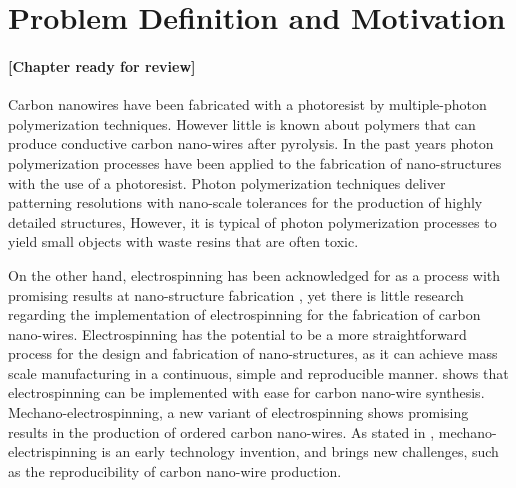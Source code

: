 
\chapter{Problem Definition and Motivation} %

\label{Chapter:ProblemDefinitionandMotivation}

\subsubsection*{\color{mygray}[Chapter ready for review]}

Carbon nanowires have been fabricated with a photoresist by multiple-photon polymerization techniques. However little is known about polymers that can produce conductive carbon nano-wires after pyrolysis. In the past years photon polymerization processes have been applied to the fabrication of nano-structures with the use of a photoresist. \cite{Boer2014} Photon polymerization techniques deliver patterning resolutions with nano-scale tolerances for the production of highly detailed structures, \cite{Hribar2014} However, it is typical of photon polymerization processes to yield small objects with waste resins that are often toxic. \cite{Ovsianikov2012}

On the other hand, electrospinning has been acknowledged for as a process with promising results at nano-structure fabrication \cite{Boer2014}, yet there is little research regarding the implementation of electrospinning for the fabrication of carbon nano-wires. Electrospinning has the potential to be a more straightforward process for the design and fabrication of nano-structures, as it can achieve mass scale manufacturing in a continuous, simple and reproducible manner. \cite{Cardenas2017} shows that electrospinning can be implemented with ease for carbon nano-wire synthesis. Mechano-electrospinning, a new variant of electrospinning shows promising results in the production of ordered carbon nano-wires. As stated in \cite{Cardenas2017}, mechano-electrispinning is an early technology invention, and brings new challenges, such as the reproducibility of carbon nano-wire production.

